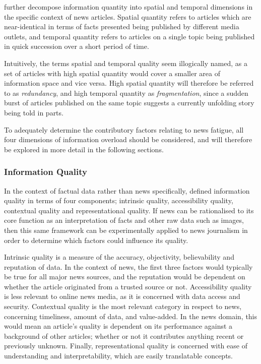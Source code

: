 \citet{GuestEditorsIntroductionInformationOverload} further decompose information quantity into spatial and temporal dimensions in the specific context of news articles. Spatial quantity refers to articles which are near-identical in terms of facts presented being published by different media outlets, and temporal quantity refers to articles on a single topic being published in quick succession over a short period of time. 

Intuitively, the terms spatial and temporal quality seem illogically named, as a set of articles with high spatial quantity would cover a smaller area of information space and vice versa. High spatial quantity will therefore be referred to as \textit{redundancy}, and high temporal quantity as \textit{fragmentation}, since a sudden burst of articles published on the same topic suggests a currently unfolding story being told in parts.

To adequately determine the contributory factors relating to news fatigue, all four dimensions of information overload should be considered, and will therefore be explored in more detail in the following sections.

\subsubsection{Information Quality}
In the context of factual data rather than news specifically, \citet{DataQualityInContext} defined information quality in terms of four components; intrinsic quality, accessibility quality, contextual quality and representational quality. If news can be rationalised to its core function as an interpretation of facts and other raw data such as images, then this same framework can be experimentally applied to news journalism in order to determine which factors could influence its quality.

Intrinsic quality is a measure of the accuracy, objectivity, believability and reputation of data. In the context of news, the first three factors would typically be true for all major news sources, and the reputation would be dependent on whether the article originated from a trusted source or not. Accessibility quality is less relevant to online news media, as it is concerned with data access and security. Contextual quality is the most relevant category in respect to news, concerning timeliness, amount of data, and value-added. In the news domain, this would mean an article's quality is dependent on its performance against a background of other articles; whether or not it contributes anything recent or previously unknown. Finally, representational quality is concerned with ease of understanding and interpretability, which are easily translatable concepts.

